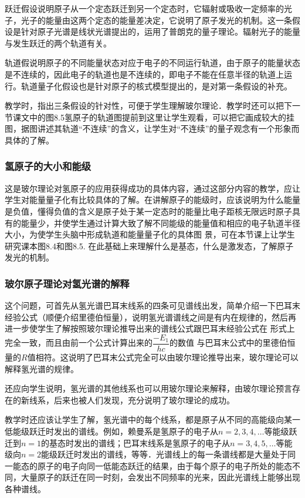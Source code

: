 跃迁假设说明原子从一个定态跃迁到另一个定态时，它辐射或吸收一定频率的光子，光子的能量由这两个定态的能量差决定，它说明了原子发光的机制。这一条假设是针对原子光谱是线状光谱提出的，运用了普朗克的量子理论。辐射光子的能量与发生跃迁的两个轨道有关。

轨道假说明原子的不同能量状态对应于电子的不同运行轨道，由于原子的能量状态是不连续的，因此电子的轨道也是不连续的，即电子不能在任意半径的轨道上运行。轨道量子化假设也是针对原子的核式模型提出的，是对第一条假设的补充。

教学时，指出三条假设的针对性，可便于学生理解玻尔理论．教学时还可以把下一节课文中的图8.5氢原子的轨道图提前到这里让学生观看，可以把它画成较大的挂图，据图讲述其轨道“不连续”的含义，让学生对“不连续”的量子观念有一个形象而具体的了解。

\subsubsection{氢原子的大小和能级} 

这是玻尔理论对氢原子的应用获得成功的具体内容，通过这部分内容的教学，应让学生对能量量子化有比较具体的了解。在讲解原子的能级时，应该说明为什么能量是负值，懂得负值的含义是原子处于某一定态时的能量比电子距核无限远时原子具有的能量少，并使学生通过计算大致了解不同能级的能量值和相应的电子轨道半径大小，为使学生头脑中形成轨道和能量量子化的具体图
景，可在本节课上让学生研究课本图8.4和图8.5. 在此基础上来理解什么是基态，什么是激发态，了解原子发光的机制。

\subsubsection{玻尔原子理论对氢光谱的解释}

这个问题，可首先从氢光谱巴耳末线系的四条可见谱线出发，简单介绍一下巴耳末经验公式（顺便介绍里德伯恒量），说明氢光谱谱线之间是有内在规律的，然后再进一步使学生了解按照玻尔理论推导出来的谱线公式跟巴耳末经验公式在
形式上完全一致，而且由前一个公式计算出来的$\dfrac{-E_1}{hc}$的数值
与巴耳末公式中的里德伯恒量的$R$值相符。这说明了巴耳末公式完全可以由玻尔理论推导出来，玻尔理论可以解释氢光谱的规律。

还应向学生说明，氢光谱的其他线系也可以用玻尔理论来解释，由玻尔理论预言存在的新线系，后来也被人们发现，充分说明了玻尔理论的成功。

教学时还应该让学生了解，氢光谱中的每个线系，都是原子从不同的高能级向某一低能级跃迁时发出的谱线。例如，赖曼系是氢原子的电子从$n=2, 3, 4,\ldots$等能级跃迁到$n=1$的基态时发出的谱线；巴耳末线系是氢原子的电子从$n=3, 4, 5,\ldots$等能级向$n=2$能级跃迁时发出的谱线，等等．光谱线上的每一条谱线都是大量处于同一能态的原子的电子向同一低能态跃迁的结果，由于每个原子的电子所处的能态不同，大量原子的跃迁在同一时刻，会发出不同频率的光来，因此光谱线上能够出现各种谱线。

